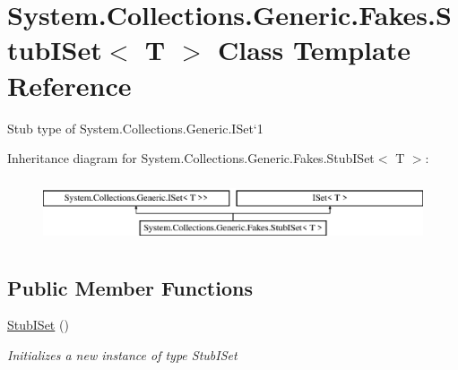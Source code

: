 \hypertarget{class_system_1_1_collections_1_1_generic_1_1_fakes_1_1_stub_i_set_3_01_t_01_4}{\section{System.\-Collections.\-Generic.\-Fakes.\-Stub\-I\-Set$<$ T $>$ Class Template Reference}
\label{class_system_1_1_collections_1_1_generic_1_1_fakes_1_1_stub_i_set_3_01_t_01_4}
}


Stub type of System.\-Collections.\-Generic.\-I\-Set`1 


Inheritance diagram for System.\-Collections.\-Generic.\-Fakes.\-Stub\-I\-Set$<$ T $>$\-:\begin{figure}[H]
\begin{center}
\leavevmode
\includegraphics[height=1.904762cm]{class_system_1_1_collections_1_1_generic_1_1_fakes_1_1_stub_i_set_3_01_t_01_4}
\end{center}
\end{figure}
\subsection*{Public Member Functions}
\begin{DoxyCompactItemize}
\item 
\hyperlink{class_system_1_1_collections_1_1_generic_1_1_fakes_1_1_stub_i_set_3_01_t_01_4_ad88692b886dd150b68f53494fefdcbab}{Stub\-I\-Set} ()
\begin{DoxyCompactList}\small\item\em Initializes a new instance of type Stub\-I\-Set\end{DoxyCompactList}\end{DoxyCompactItemize}
